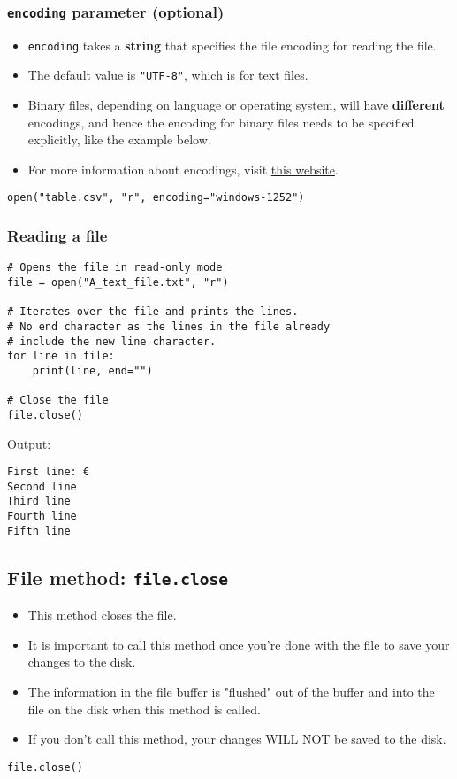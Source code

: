 \documentclass[11pt]{article}
\begin{document}
\subsubsection{\texttt{encoding} parameter (optional)}
\label{sec:org9852085}
\begin{itemize}
\item \texttt{encoding} takes a \textbf{string} that specifies the file encoding for reading the file.
\item The default value is \texttt{"UTF-8"}, which is for text files.
\item Binary files, depending on language or operating system, will have \textbf{different} encodings, and hence the encoding for binary files needs to be specified explicitly, like the example below.
\item For more information about encodings, visit \href{http://getpython3.com/diveintopython3/strings.html\#boring-stuff}{this website}.
\end{itemize}
\begin{verbatim}
open("table.csv", "r", encoding="windows-1252")
\end{verbatim}

\subsubsection{Reading a file}
\label{sec:org54e2363}
\begin{verbatim}
# Opens the file in read-only mode
file = open("A_text_file.txt", "r")

# Iterates over the file and prints the lines.
# No end character as the lines in the file already
# include the new line character.
for line in file:
    print(line, end="")

# Close the file
file.close()
\end{verbatim}

 \noindent Output:

\begin{verbatim}
First line: €
Second line
Third line
Fourth line
Fifth line
\end{verbatim}


 \newpage

\subsection{File method: \texttt{file.close}}
\label{sec:orgb04e2ba}
\begin{itemize}
\item This method closes the file.
\item It is important to call this method once you're done with the file to save your changes to the disk.
\item The information in the file buffer is "flushed" out of the buffer and into the file on the disk when this method is called.
\item If you don't call this method, your changes WILL NOT be saved to the disk.
\end{itemize}
\begin{verbatim}
file.close()
\end{verbatim}
\end{document}
